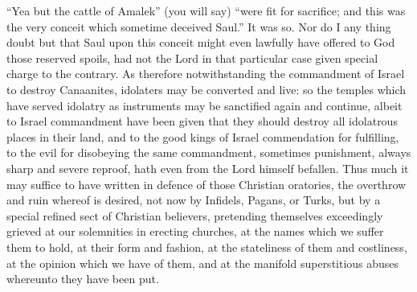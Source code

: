 “Yea but the cattle of Amalek” (you will say) “were fit  for sacrifice; and this was the very conceit which sometime deceived Saul.” It was so. Nor do I any thing doubt but that Saul upon this conceit might even lawfully have offered to God those reserved spoils, had not the Lord in that particular case given special charge to the contrary.
As therefore notwithstanding the commandment of Israel to destroy Canaanites, idolaters may be converted and live: so the temples which have served idolatry as instruments may be sanctified again and continue, albeit to Israel commandment have been given that they should destroy all idolatrous places in their land, and to the good kings of Israel commendation for fulfilling, to the evil for disobeying the same commandment, sometimes punishment, always sharp and severe reproof, hath even from the Lord himself befallen.
Thus much it may suffice to have written in defence of those Christian oratories, the overthrow and ruin whereof is desired, not now by Infidels, Pagans, or Turks, but by a special refined sect of Christian believers, pretending themselves exceedingly grieved at our solemnities in erecting churches, at the names which we suffer them to hold, at their form and fashion, at the stateliness of them and costliness, at the opinion which we have of them, and at the manifold superstitious abuses whereunto they have been put.


